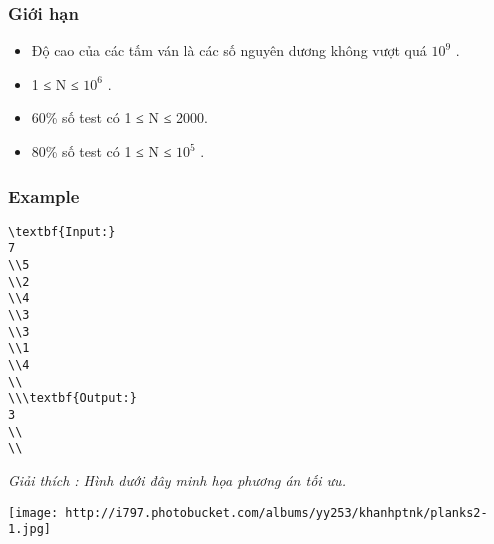 \subsubsection{   Giới hạn  }
\begin{itemize}
	\item     Độ cao của các tấm ván là các số nguyên dương không vượt quá $10^{9}$    .   
	\item     1 ≤ N ≤ $10^{6}$    .   
	\item     60\% số test có 1 ≤ N ≤ 2000.   
	\item     80\% số test có 1 ≤ N ≤ $10^{5}$    .   
\end{itemize}

\subsubsection{   Example  }
\begin{verbatim}
\textbf{Input:}
7
\\5
\\2
\\4
\\3
\\3
\\1
\\4
\\
\\\textbf{Output:}
3
\\
\\\end{verbatim}

\emph{     Giải thích        : Hình dưới đây minh họa phương án tối ưu.   }


\texttt{[image: http://i797.photobucket.com/albums/yy253/khanhptnk/planks2-1.jpg]}
